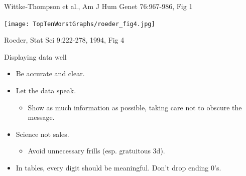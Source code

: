 \documentclass[12pt]{article}
\newcommand{\headsize}{\fontsize{35}{35} \selectfont}
\newcommand{\smallsize}{\fontsize{25}{30} \selectfont}
\newcommand{\smallersize}{\fontsize{20}{25} \selectfont}
\newcommand{\smallestsize}{\fontsize{18}{22} \selectfont}
\begin{document}
\vfill \hfill \smallestsize \color{blue}
Wittke-Thompson et al., Am J Hum Genet 76:967-986, Fig 1

\newpage
\thispagestyle{empty}


\headsize \color{yellow}
\hfill \begin{minipage}{5.75in}
\end{minipage}

\vspace{30mm}

\centerline{\texttt{[image: TopTenWorstGraphs/roeder\_fig4.jpg]}}


\vfill \hfill \smallestsize \color{blue}
Roeder, Stat Sci 9:222-278, 1994, Fig 4


\newpage


\headsize \color{yellow}
\hfill \begin{minipage}{5.75in}
\centering
Displaying data well
\end{minipage}

\vspace{30mm}
\smallsize \color{white}

\hspace{0.5in} \begin{minipage}[t]{9in}
\begin{itemize}

\itemsep24pt

\item Be accurate and clear.

\item Let the data speak.

{\color{blue} \smallersize
\begin{itemize}
\item Show as much information as possible, taking care not to
  obscure the message.
\end{itemize} }

\item Science not sales.

{\color{blue} \smallersize
\begin{itemize}
\item Avoid unnecessary frills (esp. gratuitous 3d).
\end{itemize} }

\item In tables, every digit should be meaningful. Don't drop ending 0's.

\end{itemize}
\end{minipage}
\end{document}

